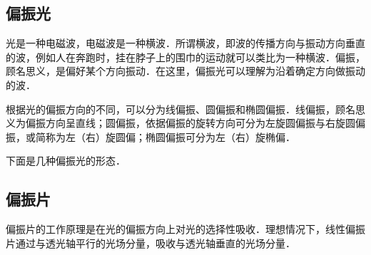 
\begin{issues}
\issueDraft
\end{issues}


\subsection{偏振光}

光是一种电磁波，电磁波是一种横波．所谓横波，即波的传播方向与振动方向垂直的波，例如人在奔跑时，挂在脖子上的围巾的运动就可以类比为一种横波．偏振，顾名思义，是偏好某个方向振动．在这里，偏振光可以理解为沿着确定方向做振动的波．

根据光的偏振方向的不同，可以分为线偏振、圆偏振和椭圆偏振．线偏振，顾名思义为偏振方向呈直线；圆偏振，依据偏振的旋转方向可分为左旋圆偏振与右旋圆偏振，或简称为左（右）旋圆偏；椭圆偏振可分为左（右）旋椭偏．

下面是几种偏振光的形态．


\subsection{偏振片}
偏振片的工作原理是在光的偏振方向上对光的选择性吸收．理想情况下，线性偏振片通过与透光轴平行的光场分量，吸收与透光轴垂直的光场分量．

